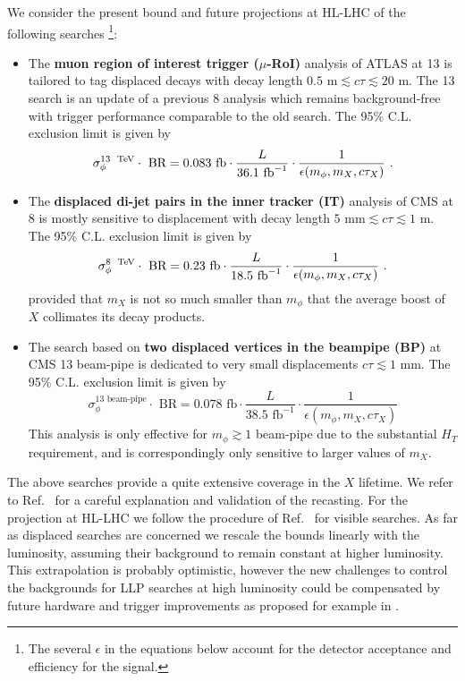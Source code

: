 We consider the present bound and future projections at HL-LHC of the following searches \footnote{The several $\epsilon$ in the equations below account for the detector acceptance and efficiency for the signal.}:
\begin{itemize}
\item The {\bf muon region of interest trigger ($\mu$-RoI)}  analysis of  ATLAS at 13 \UTeV \cite{Aaboud:2018aqj} is tailored to tag displaced decays with decay length $0.5\text{ m}\lesssim c\tau\lesssim 20\text{ m}$. The 13 \UTeV search is an update of a previous 8 \UTeV analysis \cite{Aad:2015uaa} which remains background-free with trigger performance comparable to the old search. The 95\% C.L. exclusion limit is given by 
\begin{equation}
\sigma_\phi^{13\text{ \UTeV}}\cdot\text{ BR}=  0.083\text{ fb}\cdot \frac{L}{36.1\text{ fb}^{-1}}\cdot \frac{1}{\epsilon(m_\phi,m_X,c\tau_X)}\ .
\end{equation}
\item The { \bf displaced di-jet pairs in the inner tracker (IT)} analysis of CMS at 8 \UTeV \cite{CMS:2014wda} is mostly sensitive to displacement with decay length $\text{5 mm}\lesssim c\tau\lesssim 1 \text{ m}$. The 95\% C.L. exclusion limit is given by 
\begin{equation} 
\sigma_\phi^{8\text{ \UTeV}}\cdot\text{ BR}= 0.23\text{ fb}\cdot \frac{L}{18.5\text{ fb}^{-1}}\cdot \frac{1}{\epsilon(m_\phi,m_X,c\tau_X)} \ .
\end{equation}
provided that $m_X$ is not so much smaller than $m_\phi$ that the average boost of $X$ collimates its decay products.
\item The search based on { \bf two  displaced vertices in the beampipe (BP)} at CMS 13 beam-pipe \cite{Sirunyan:2018pwn} is dedicated to very small displacements $c\tau\lesssim 1\text{ mm}$. The 95\% C.L. exclusion limit is given by 
\begin{equation}
\sigma_\phi^{13\text{ beam-pipe}}\cdot\text{ BR}= 0.078\text{ fb}\cdot \frac{L}{38.5\text{ fb}^{-1}}\cdot \frac{1}{\epsilon(m_\phi,m_X,c\tau_X)}
\end{equation}
This analysis is only effective for $m_\phi \gtrsim 1$ beam-pipe due to the substantial $H_T$ requirement, and is correspondingly only sensitive to larger values of $m_X$.
\end{itemize}
The above searches provide a quite extensive coverage in the $X$ lifetime. We refer to Ref.~\cite{Alipour-fard:2018mre} for a careful explanation and validation of the recasting. For the projection at HL-LHC we follow the procedure of Ref.~\cite{Thamm:2015zwa,Buttazzo:2015bka} for visible searches. As far as displaced searches are concerned we rescale the bounds linearly with the luminosity, assuming their background to remain constant at higher luminosity. This extrapolation is probably optimistic, however the new challenges to control the backgrounds for LLP searches at high luminosity could be compensated  by future hardware and trigger improvements as proposed for example in \cite{Gershtein:2017tsv,Liu:2018wte}.

